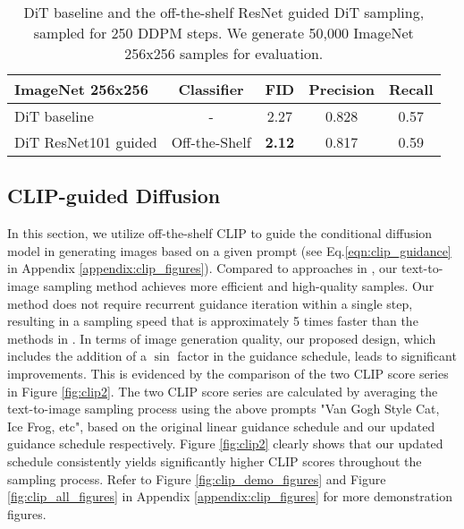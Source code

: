 \documentclass{article}
\theoremstyle{definition}
\begin{document}
\begin{table}[h!]
\caption{DiT \citep{peebles2022scalable} baseline and the off-the-shelf ResNet guided DiT sampling, sampled for 250 DDPM steps. We generate 50,000 ImageNet 256x256 samples for evaluation.}
\label{table:dit_guided_diffusion_results}
\begin{center}
\begin{small}
\begin{sc}
\begin{tabular}{lcccc}
\toprule
ImageNet 256x256 & Classifier & FID & Precision & Recall \\
\midrule
DiT baseline & -  &  2.27  & 0.828 & 0.57 \\
DiT  ResNet101 guided & Off-the-Shelf &  \bf{2.12}  & 0.817 & 0.59   \\

\bottomrule
\end{tabular}
\end{sc}
\end{small}
\end{center}
\end{table}


\subsection{CLIP-guided Diffusion}\label{sec:clip}
In this section, we utilize off-the-shelf CLIP \citep{radford2021learning} to guide the conditional diffusion model \citep{dhariwal2021diffusion} in generating images based on a given prompt (see Eq.\ref{eqn:clip_guidance} in Appendix \ref{appendix:clip_figures}).
Compared to approaches in \cite{bansal2023universal,wallace2023end}, our text-to-image sampling method achieves more efficient and high-quality samples. Our method does not require recurrent guidance iteration within a single step, resulting in a sampling speed that is approximately 5 times faster than the methods in \cite{bansal2023universal}. In terms of image generation quality, our proposed design, which includes the addition of a $\sin$ factor in the guidance schedule, leads to significant improvements. This is evidenced by the comparison of the two CLIP score series in Figure \ref{fig:clip2}. The two CLIP score series are calculated by averaging the text-to-image sampling process using the above prompts "Van Gogh Style Cat, Ice Frog, etc", based on the original linear guidance schedule and our updated guidance schedule respectively. Figure \ref{fig:clip2} clearly shows that our updated schedule consistently yields significantly higher CLIP scores throughout the sampling process.
Refer to Figure \ref{fig:clip_demo_figures} and Figure \ref{fig:clip_all_figures} in Appendix \ref{appendix:clip_figures} for more demonstration figures. 
\end{document}
